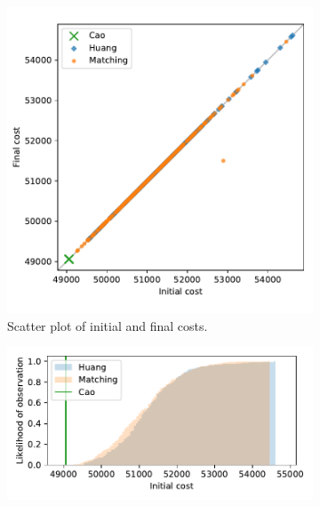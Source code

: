 \documentclass[smallextended]{svjour3}
\begin{document}
\begin{figure}
    \begin{subfigure}{.5\textwidth}
        \includegraphics[width=\linewidth]{Fig7a.pdf}
        \caption{Scatter plot of initial and final costs.}
    \end{subfigure}
    \hfill%
    \begin{subfigure}{.5\textwidth}
        \includegraphics[width=\linewidth]{Fig7b1.pdf}


\end{subfigure}
\end{figure}
\end{document}
